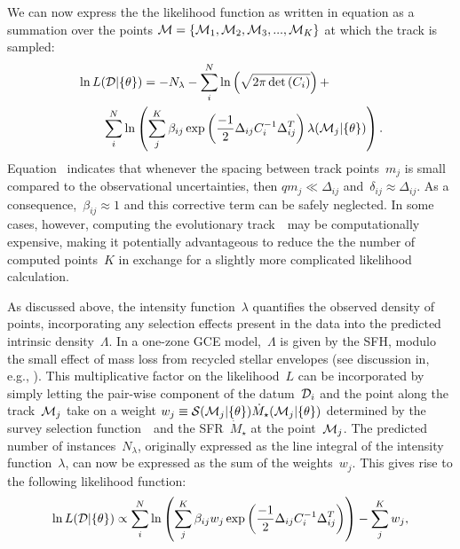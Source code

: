 \documentclass[ms.tex]{subfiles}
\begin{document}
We can now express the the likelihood function as written in equation
 as a summation over the points
$\mathcal{M} = \{\mathcal{M}_1, \mathcal{M}_2, \mathcal{M}_3, ..., \mathcal{M}_K\}$
at which the track is sampled:
\begin{equation}\begin{split}
&\ln L(\mathcal{D} | \{\theta\}) = -N_\lambda
- \sum_i^N \ln \left(\sqrt{2\pi \det{(C_i)}}\right) +
\\
&\qquad \sum_i^N \ln \left(
\sum_j^K \beta_{ij}
\exp\left(\frac{-1}{2}\Delta_{ij}C_i^{-1}\Delta_{ij}^T\right)
\lambda(\mathcal{M}_j | \{\theta\})
\right).
\end{split}\end{equation}
Equation~ indicates that whenever the spacing between
track points~$m_j$ is small compared to the observational uncertainties, then
$qm_j \ll \Delta_{ij}$ and~$\delta_{ij} \approx \Delta_{ij}$.
As a consequence,~$\beta_{ij} \approx 1$ and this corrective term can be safely
neglected.
In some cases, however, computing the evolutionary track~~may be
computationally expensive, making it potentially advantageous to reduce the
the number of computed points~$K$ in exchange for a slightly more complicated
likelihood calculation.
\par
As discussed above, the intensity function~$\lambda$ quantifies the observed
density of points, incorporating any selection effects present in the data into
the predicted intrinsic density~$\Lambda$.
In a one-zone GCE model,~$\Lambda$ is given by the SFH, modulo the small effect
of mass loss from recycled stellar envelopes (see discussion in, e.g.,
\citealt{Weinberg2017}).
This multiplicative factor on the likelihood~$L$ can be incorporated by simply
letting the pair-wise component of the datum~$\mathcal{D}_i$ and the point along
the track~$\mathcal{M}_j$ take on a weight
$w_j \equiv \mathcal{S}(\mathcal{M}_j | \{\theta\}) \dot{M}_\star(\mathcal{M}_j |
\{\theta\})$ determined by the survey selection function~~and the
SFR~$\dot{M}_\star$ at the point~$\mathcal{M}_j$.
The predicted number of instances~$N_\lambda$, originally expressed as the
line integral of the intensity function~$\lambda$, can now be expressed as the
sum of the weights~$w_j$.
This gives rise to the following likelihood function:
\begin{equation}
\ln L(\mathcal{D} | \{\theta\}) \propto
\sum_i^N \ln \left(\sum_j^K
\beta_{ij} w_j \exp\left(\frac{-1}{2}\Delta_{ij} C_i^{-1} \Delta_{ij}^T\right)
\right) - \sum_j^K w_j,
\label{eq:lnL_minus_weights}
\end{equation}
\end{document}
